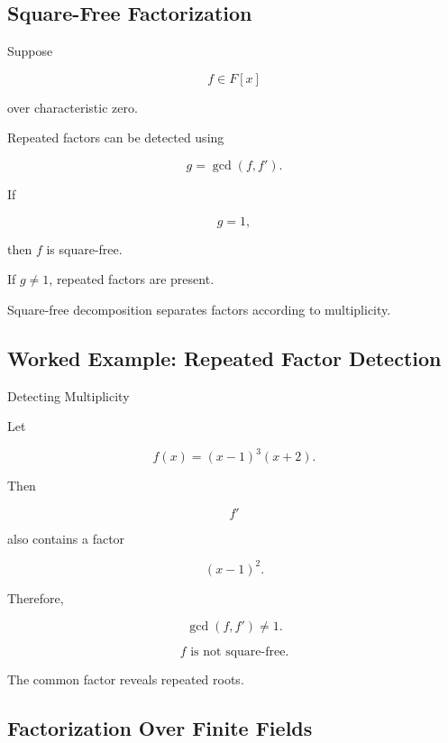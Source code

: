 \subsection{Square-Free Factorization}
\label{subsec:computer-algebra-square-free}

Suppose

\[
f\in F[x]
\]

over characteristic zero.

Repeated factors can be detected using

\[
\boxed{
g
=
\gcd(f,f').
}
\]

If

\[
g=1,
\]

then \(f\) is square-free.

If \(g\neq1\), repeated factors are present.

Square-free decomposition separates factors according to multiplicity.

\subsection{Worked Example: Repeated Factor Detection}
\label{subsec:worked-square-free}

\begin{workedexamplebox}{Detecting Multiplicity}

Let

\[
f(x)
=
(x-1)^3(x+2).
\]

Then

\[
f'
\]

also contains a factor

\[
(x-1)^2.
\]

Therefore,

\[
\gcd(f,f')
\neq1.
\]

\begin{answerbox}
\[
\boxed{
f
\text{ is not square-free.}
}
\]
\end{answerbox}

The common factor reveals repeated roots.

\end{workedexamplebox}

\subsection{Factorization Over Finite Fields}
\label{subsec:finite-field-factorization}

